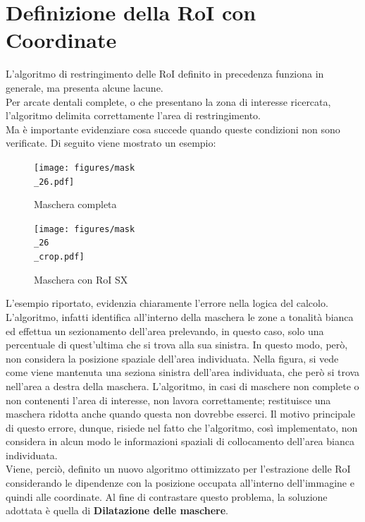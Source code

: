 \documentclass[12pt,a4paper,openright,twoside]{book}
\begin{document}
\section{Definizione della RoI con Coordinate}
L'algoritmo di restringimento delle RoI definito in precedenza funziona in generale, ma presenta alcune lacune.\\
Per arcate dentali complete, o che presentano la zona di interesse ricercata, l'algoritmo delimita correttamente l'area di restringimento.\\
Ma è importante evidenziare cosa succede quando queste condizioni non sono verificate. Di seguito viene mostrato un esempio:
\begin{figure}[H]
    \centering
    \begin{minipage}{0.45\textwidth}
	\centering
    	\texttt{[image: figures/mask\\\_26.pdf]}
    	\caption{Maschera completa}
    	\label{lab:Maschera completa}
    \end{minipage}\hfill
    \begin{minipage}{0.45\textwidth}
    	\centering
    	\texttt{[image: figures/mask\\\_26\\\_crop.pdf]}
    	\caption{Maschera con RoI SX}
    	\label{lab:Maschera con RoI sx}
    \end{minipage}\hfill
\end{figure}
 
L'esempio riportato, evidenzia chiaramente l'errore nella logica del calcolo. L'algoritmo, infatti identifica all'interno della maschera le zone a tonalità bianca ed effettua un sezionamento dell'area prelevando, in questo caso, solo una percentuale di quest'ultima che si trova alla sua sinistra. In questo modo, però, non considera la posizione spaziale dell'area individuata. Nella figura, si vede come viene mantenuta una seziona sinistra dell'area individuata, che però si trova nell'area a destra della maschera. L'algoritmo, in casi di maschere non complete o non contenenti l'area di interesse, non lavora correttamente; restituisce una maschera ridotta anche quando questa non dovrebbe esserci. Il motivo principale di questo errore, dunque, risiede nel fatto che l'algoritmo, così implementato, non considera in alcun modo le informazioni spaziali di collocamento dell'area bianca individuata.\\

Viene, perciò, definito un nuovo algoritmo ottimizzato per l'estrazione delle RoI considerando le dipendenze con la posizione occupata all'interno dell'immagine e quindi alle coordinate.
Al fine di contrastare questo problema, la soluzione adottata è quella di \textbf{Dilatazione delle maschere}.
\begin{figure}[H]
    \centering
    
\end{figure}
\end{document}
